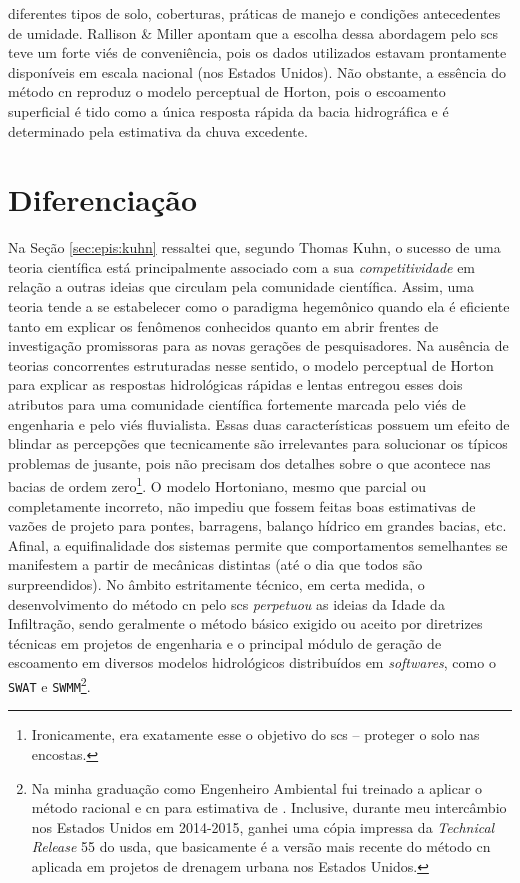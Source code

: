 \documentclass[./main.tex]{subfiles}
\begin{document}
diferentes tipos de solo, coberturas, práticas de manejo e condições antecedentes de umidade. Rallison \& Miller apontam que a escolha dessa abordagem pelo \acrshort{scs} teve um forte viés de conveniência, pois os dados utilizados estavam prontamente disponíveis em escala nacional (nos Estados Unidos). Não obstante, a essência do método \acrshort{cn} reproduz o modelo perceptual de Horton, pois o escoamento superficial é tido como a única resposta rápida da bacia hidrográfica e é determinado pela estimativa da chuva excedente. 

\section{Diferenciação}


\par Na Seção \ref{sec:epis:kuhn} ressaltei que, segundo Thomas Kuhn, o sucesso de uma teoria científica está principalmente associado com a sua \textit{competitividade} em relação a outras ideias que circulam pela comunidade científica. Assim, uma teoria tende a se estabelecer como o \gls{paradigma} hegemônico quando ela é eficiente tanto em explicar os fenômenos conhecidos quanto em abrir frentes de investigação promissoras para as novas gerações de pesquisadores. Na ausência de teorias concorrentes estruturadas nesse sentido, o modelo perceptual de Horton para explicar as respostas hidrológicas rápidas e lentas entregou esses dois atributos para uma comunidade científica fortemente marcada pelo viés de engenharia e pelo viés fluvialista. Essas duas características possuem um efeito de blindar as percepções que tecnicamente são irrelevantes para solucionar os típicos problemas de jusante, pois não precisam dos detalhes sobre o que acontece nas bacias de ordem zero\footnote{Ironicamente, era exatamente esse o objetivo do \acrshort{scs} -- proteger o solo nas encostas.}. O modelo Hortoniano, mesmo que parcial ou completamente incorreto, não impediu que fossem feitas boas estimativas de vazões de projeto para pontes, barragens, balanço hídrico em grandes bacias, etc. Afinal, a equifinalidade dos sistemas permite que comportamentos semelhantes se manifestem a partir de mecânicas distintas (até o dia que todos são surpreendidos). No âmbito estritamente técnico, em certa medida, o desenvolvimento do método \acrshort{cn} pelo \acrshort{scs} \textit{perpetuou} as ideias da Idade da Infiltração, sendo geralmente o método básico exigido ou aceito por diretrizes técnicas em projetos de engenharia e o principal módulo de geração de escoamento em diversos modelos hidrológicos distribuídos em \textit{softwares}, como o \texttt{SWAT} e \texttt{SWMM}\footnote{Na minha graduação como Engenheiro Ambiental fui treinado a aplicar o método racional e \acrshort{cn} para estimativa de . Inclusive, durante meu intercâmbio nos Estados Unidos em 2014-2015, ganhei uma cópia impressa da \textit{Technical Release} 55 do \acrshort{usda}, que basicamente é a versão mais recente do método \acrshort{cn} aplicada em projetos de drenagem urbana nos Estados Unidos.}. 
\end{document}
